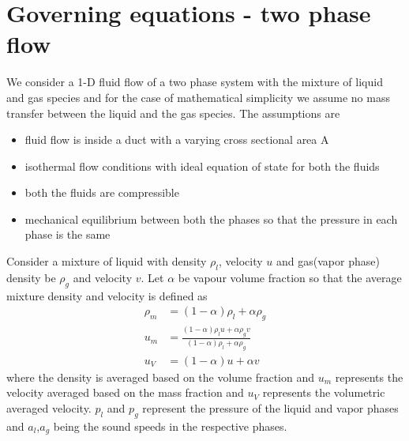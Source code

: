 \documentclass[a4paper,16pt]{article}
\begin{document}
\section{Governing equations - two phase flow}
We consider a 1-D fluid flow of a two phase system with the mixture of liquid and gas species and for the case of mathematical simplicity we assume no mass transfer between the liquid and the gas species. The assumptions are
 \begin{itemize}
 \item fluid flow is inside a duct with a varying cross sectional area A
 \item isothermal flow conditions with ideal equation of state for both the fluids
 \item both the fluids are compressible
 \item mechanical equilibrium between both the phases so that the pressure in each phase is the same
 \end{itemize}
Consider a mixture of liquid with density $\rho_{l}$, velocity $u$ and gas(vapor phase) density be $\rho_{g}$ and velocity $v$. Let $\alpha$ be vapour volume fraction so that the average mixture density and velocity is defined as
 \begin{align}
\rho_{m} &= (1-\alpha)\rho_{l} + \alpha \rho_{g}\\
u_{m} &= \frac{(1-\alpha)\rho_{l}u + \alpha \rho_{g}v}{(1-\alpha)\rho_{l} + \alpha \rho_{g}}\\
u_V &= (1-\alpha)u + \alpha v
 \end{align}
where the density is averaged based on the volume fraction and $u_m$ represents the velocity averaged based on the mass fraction and $u_V$ represents the volumetric averaged velocity. $p_{l}$ and $p_{g}$ represent the pressure of the liquid and vapor phases and $a_{l}$,$a_{g}$ being the sound speeds in the respective phases.
\end{document}
